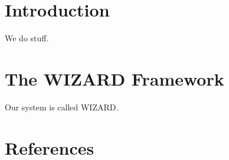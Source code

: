 \documentclass{article}
\begin{document}
\section{Introduction}
We do stuff.

\section{The WIZARD Framework}
Our system is called WIZARD.

\section{References}

\end{document}
